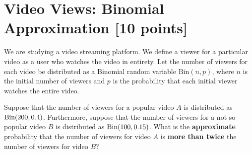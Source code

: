 \newpage
\section{Video Views: Binomial Approximation [10 points]}


We are studying a video streaming platform. We define a viewer for a particular video as a user who watches the video in entirety. Let the number of viewers for each video be distributed as a Binomial random variable $\text{Bin}(n, p)$, where $n$ is the initial number of viewers and $p$ is the probability that each initial viewer watches the entire video.

Suppose that the number of viewers for a popular video $A$ is distributed as $\text{Bin}(200{}, 0.4{})$. Furthermore, suppose that the number of viewers for a not-so-popular video $B$ is distributed as $\text{Bin}(100{}, 0.15{})$. What is the \textbf{approximate} probability that the number of viewers for video $A$ is \textbf{more than twice} the number of viewers for video $B$?

		

